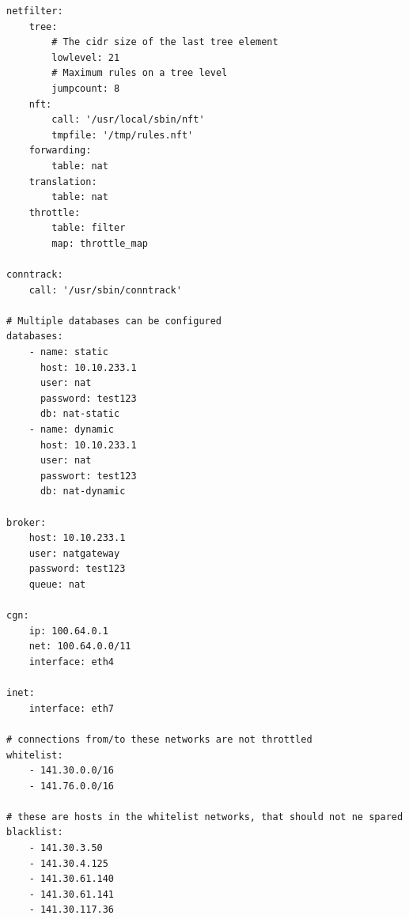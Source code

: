 \documentclass{report}
\begin{document}
\begingroup
\fontsize{9pt}{9pt}\selectfont
\begin{verbatim}
netfilter:
    tree:
        # The cidr size of the last tree element
        lowlevel: 21
        # Maximum rules on a tree level
        jumpcount: 8
    nft:
        call: '/usr/local/sbin/nft'
        tmpfile: '/tmp/rules.nft'
    forwarding:
        table: nat
    translation:
        table: nat
    throttle:
        table: filter
        map: throttle_map

conntrack:
    call: '/usr/sbin/conntrack'

# Multiple databases can be configured
databases:
    - name: static
      host: 10.10.233.1
      user: nat
      password: test123
      db: nat-static
    - name: dynamic
      host: 10.10.233.1
      user: nat
      passwort: test123
      db: nat-dynamic

broker:
    host: 10.10.233.1
    user: natgateway
    password: test123
    queue: nat

cgn:
    ip: 100.64.0.1
    net: 100.64.0.0/11
    interface: eth4

inet:
    interface: eth7

# connections from/to these networks are not throttled
whitelist:
    - 141.30.0.0/16
    - 141.76.0.0/16

# these are hosts in the whitelist networks, that should not ne spared
blacklist:
    - 141.30.3.50
    - 141.30.4.125
    - 141.30.61.140
    - 141.30.61.141
    - 141.30.117.36
\end{verbatim}
\endgroup


{}

\end{document}
